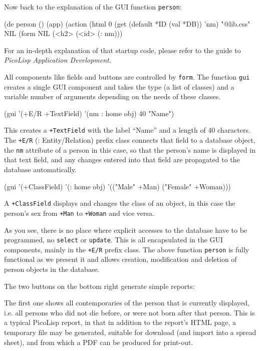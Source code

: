 Now back to the explanation of the GUI function \texttt{person}:


\begin{wideverbatim}
(de person ()
   (app)
   (action
      (html 0 (get (default *ID (val *DB)) 'nm) "@lib.css" NIL
         (form NIL
            (<h2> (<id> (: nm)))
\end{wideverbatim}

For an in-depth explanation of that startup code, please refer to the
guide to \emph{PicoLisp Application Development}.

All components like fields and buttons are controlled by \texttt{form}. The
function \texttt{gui} creates a single GUI component and takes the type (a list
of classes) and a variable number of arguments depending on the needs of
these classes.


\begin{wideverbatim}
(gui '(+E/R +TextField) '(nm : home obj) 40 "Name")
\end{wideverbatim}

This creates a \texttt{+TextField} with the label ``Name'' and a length of 40
characters. The \texttt{+E/R} (: Entity/Relation) prefix class connects that
field to a database object, the \texttt{nm} attribute of a person in this case,
so that the person's name is displayed in that text field, and any
changes entered into that field are propagated to the database
automatically.


\begin{wideverbatim}
(gui '(+ClassField) '(: home obj) '(("Male" +Man) ("Female" +Woman)))
\end{wideverbatim}

A \texttt{+ClassField} displays and changes the class of an object, in this
case the person's sex from \texttt{+Man} to \texttt{+Woman} and vice versa.

As you see, there is no place where explicit accesses to the database
have to be programmed, no \texttt{select} or \texttt{update}. This is all encapsulated
in the GUI components, mainly in the \texttt{+E/R} prefix class. The above
function \texttt{person} is fully functional as we present it and allows
creation, modification and deletion of person objects in the database.

The two buttons on the bottom right generate simple reports:

The first one shows all contemporaries of the person that is currently
displayed, i.e. all persons who did not die before, or were not born
after that person. This is a typical PicoLisp report, in that in
addition to the report's HTML page, a temporary file may be generated,
suitable for download (and import into a spread sheet), and from which a
PDF can be produced for print-out.

